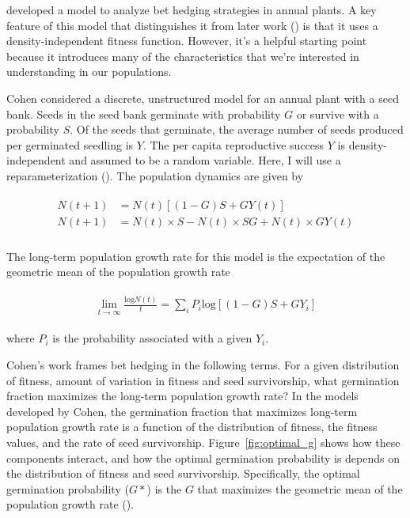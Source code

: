 \documentclass[12pt, oneside, titlepage]{article}   	%
\begin{document}
 


\cite{cohen1966} developed a model to analyze bet hedging strategies in annual plants. A key feature of this model that distinguishes it from later work (\cite{ellner1985,ellner1985a}) is that it uses a density-independent fitness function. However, it's a helpful starting point because it introduces many of the characteristics that we're interested in understanding in our populations.

Cohen considered a discrete, unstructured model for an annual plant with a seed bank. Seeds in the seed bank germinate with probability $G$ or survive with a probability $S$. Of the seeds that germinate, the average number of seeds produced per germinated seedling is $Y$. The per capita reproductive success $Y$ is density-independent and assumed to be a random variable. Here, I will use a reparameterization (\cite{ellner1985a}). The population dynamics are given by 

\begin{align}
  \begin{split}
N(t+1) & = N(t) [ (1-G)S + G Y(t)] \\
N(t+1) & = N(t) \times S - N(t) \times SG + N(t) \times G Y(t)\\
  \end{split}
\end{align}

The long-term population growth rate for this model is the expectation of the geometric mean of the population growth rate

\begin{align}
  \begin{split}
\lim_{t \to \infty } \frac{\mathrm{log} N(t)}{t} = \sum_{i} P_i\mathrm{log}[(1-G)S + G Y_i] 
  \end{split}
\end{align}

where $P_i$ is the probability associated with a given $Y_i$.

Cohen's work frames bet hedging in the following terms. For a given distribution of fitness, amount of variation in fitness and seed survivorship, what germination fraction maximizes the long-term population growth rate? In the models developed by Cohen, the germination fraction that maximizes long-term population growth rate is a function of the distribution of fitness, the fitness values, and the rate of seed survivorship. Figure~\ref{fig:optimal_g} shows how these components interact, and how the optimal germination probability is depends on the distribution of fitness and seed survivorship. Specifically, the optimal germination probability ($G*$) is the $G$ that maximizes the geometric mean of the population growth rate (\cite{ellner1985a}).
\end{document}
